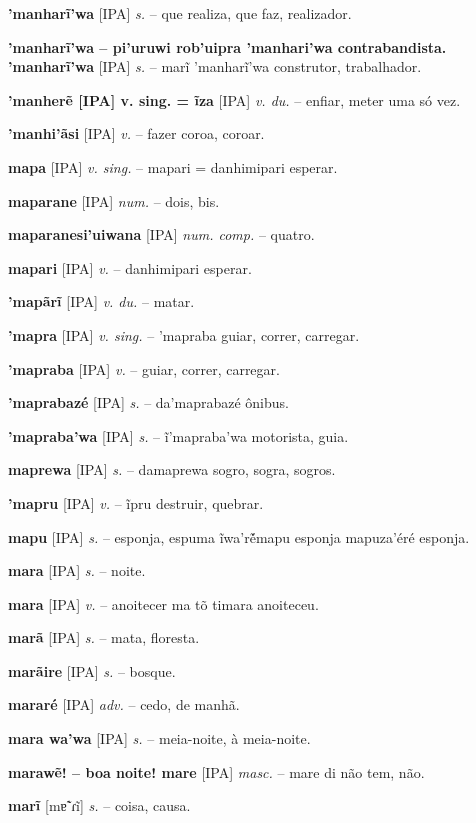 \textbf{'manharĩ'wa} [IPA] \textit{s.} -- que realiza, que faz, realizador.

\textbf{'manharĩ'wa -- pi'uruwi rob'uipra 'manhari'wa contrabandista. 'manharĩ'wa} [IPA] \textit{s.} -- marĩ 'manharĩ'wa construtor, trabalhador.

\textbf{'manherẽ [IPA] v. sing. = ĩza} [IPA] \textit{v. du.} -- enfiar, meter uma só vez.

\textbf{'manhi'ãsi} [IPA] \textit{v.} -- fazer coroa, coroar.

\textbf{mapa} [IPA] \textit{v. sing.} -- mapari = danhimipari esperar.

\textbf{maparane} [IPA] \textit{num.} -- dois, bis.

\textbf{maparanesi'uiwana} [IPA] \textit{num. comp.} -- quatro.

\textbf{mapari} [IPA] \textit{v.} -- danhimipari esperar.

\textbf{'mapãrĩ} [IPA] \textit{v. du.} -- matar.

\textbf{'mapra} [IPA] \textit{v. sing.} -- 'mapraba guiar, correr, carregar.

\textbf{'mapraba} [IPA] \textit{v.} -- guiar, correr, carregar.

\textbf{'maprabazé} [IPA] \textit{s.} -- da'maprabazé ônibus.

\textbf{'mapraba'wa} [IPA] \textit{s.} -- ĩ'mapraba'wa motorista, guia.

\textbf{maprewa} [IPA] \textit{s.} -- damaprewa sogro, sogra, sogros.

\textbf{'mapru} [IPA] \textit{v.} -- ĩpru destruir, quebrar.

\textbf{mapu} [IPA] \textit{s.} -- esponja, espuma  ĩwa'ré̃mapu esponja  mapuza'éré esponja.

\textbf{mara} [IPA] \textit{s.} -- noite.

\textbf{mara} [IPA] \textit{v.} -- anoitecer  ma tõ timara anoiteceu.

\textbf{marã} [IPA] \textit{s.} -- mata, floresta.

\textbf{marãire} [IPA] \textit{s.} -- bosque.

\textbf{mararé} [IPA] \textit{adv.} -- cedo, de manhã.

\textbf{mara wa'wa} [IPA] \textit{s.} -- meia-noite, à meia-noite.

\textbf{marawẽ! -- boa noite! mare} [IPA] \textit{masc.} -- mare di não tem, não.

\textbf{marĩ} [mɐ̃ˈɾĩ] \textit{s.} -- coisa, causa.

